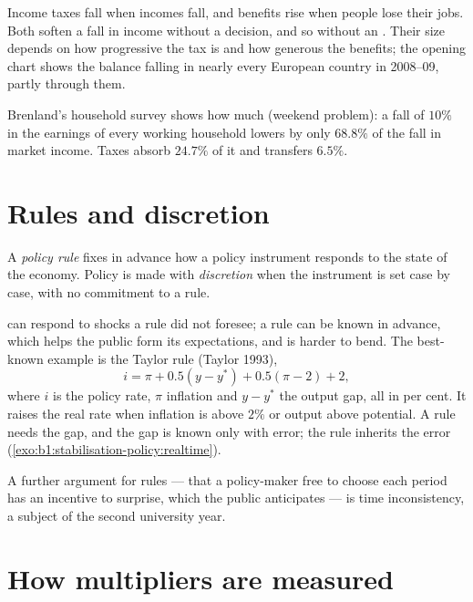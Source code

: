 Income taxes fall when incomes fall, and benefits rise when people lose
their jobs. Both soften a fall in income without a decision, and so
without an . Their size depends on how progressive the tax is
and how generous the benefits; the opening chart shows the balance falling
in nearly every European country in 2008--09, partly through them.

Brenland's household survey shows how much (weekend problem): a fall of
$10\%$ in the earnings of every working household lowers  by
only $68.8\%$ of the fall in market income. Taxes absorb $24.7\%$ of it and
transfers $6.5\%$. %

\section{Rules and discretion}\label{sec:b1:stabilisation-policy:rules}

\begin{definition}\label{def:b1:stabilisation-policy:rule}
A \emph{policy rule} fixes in advance how a policy instrument responds to
the state of the economy. Policy is made with \emph{discretion} when the
instrument is set case by case, with no commitment to a rule.
\end{definition}

 can respond to shocks
a rule did not foresee; a rule can be known in advance, which helps the
public form its expectations, and is harder to bend. The best-known
example is the Taylor rule (Taylor 1993), %
\[
i = \pi + 0.5(y - y^*) + 0.5(\pi - 2) + 2,
\]
where $i$ is the policy rate, $\pi$ inflation and $y - y^*$ the output gap, all in per
cent. It raises the real rate when inflation is above $2\%$ or output above
potential. A rule needs the gap, and the gap is known only with error; the
rule inherits the error (\cref{exo:b1:stabilisation-policy:realtime}).

A further argument for rules --- that a policy-maker free to choose each
period has an incentive to surprise, which the public anticipates --- is
time inconsistency, a subject of the second university year.

\section{How multipliers are measured}\label{sec:b1:stabilisation-policy:multipliers}

